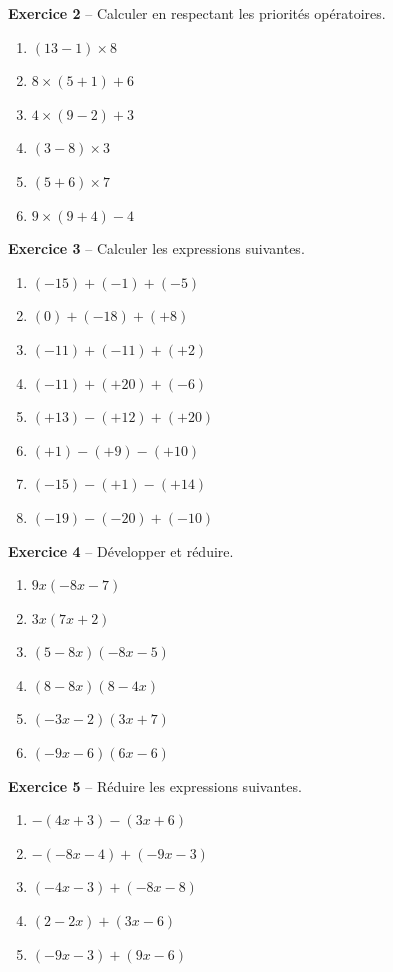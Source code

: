 \documentclass[12pt,a4paper,french]{article}
\begin{document}
\noindent\textbf{Exercice 2} -- Calculer en respectant les priorités opératoires.
\begin{enumerate}
\item $(13 - 1) \times 8$
\item $8 \times (5 + 1) + 6$
\item $4 \times (9 - 2) + 3$
\item $(3 - 8) \times 3$
\item $(5 + 6) \times 7$
\item $9 \times (9 + 4) - 4$
\end{enumerate}
\bigskip

\noindent\textbf{Exercice 3} -- Calculer les expressions suivantes.
\begin{enumerate}
\item $(-15) + (-1) + (-5)$
\item $(0) + (-18) + (+8)$
\item $(-11) + (-11) + (+2)$
\item $(-11) + (+20) + (-6)$
\item $(+13) - (+12) + (+20)$
\item $(+1) - (+9) - (+10)$
\item $(-15) - (+1) - (+14)$
\item $(-19) - (-20) + (-10)$
\end{enumerate}
\bigskip

\noindent\textbf{Exercice 4} -- Développer et réduire.
\begin{enumerate}
\item $9x(-8x - 7)$
\item $3x(7x + 2)$
\item $(5 - 8x)(-8x - 5)$
\item $(8 - 8x)(8 - 4x)$
\item $(-3x - 2)(3x + 7)$
\item $(-9x - 6)(6x - 6)$
\end{enumerate}
\bigskip

\noindent\textbf{Exercice 5} -- Réduire les expressions suivantes.
\begin{enumerate}
\item $-(4x + 3)-(3x + 6)$
\item $-(-8x - 4)+(-9x - 3)$
\item $(-4x - 3)+(-8x - 8)$
\item $(2 - 2x)+(3x - 6)$
\item $(-9x - 3)+(9x - 6)$
\end{enumerate}
\bigskip
\end{document}
